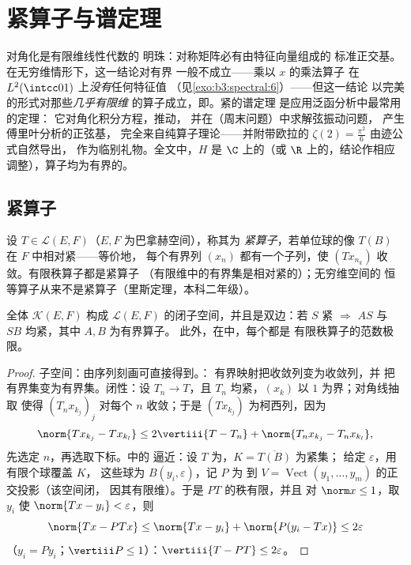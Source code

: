\chapter{紧算子与谱定理}
\label{ch:b3:spectral}

对角化是有限维线性代数的
明珠：对称矩阵必有由特征向量组成的
标准正交基。在无穷维情形下，这一结论对有界
一般不成立——乘以 $x$ 的乘法算子
在 $L^2(\intcc01)$ 上\emph{没有}任何特征值
（见\cref{exo:b3:spectral:6}）——但这一结论
以完美的形式对那些\emph{几乎有限维
}的算子成立，即。紧的谱定理
是应用泛函分析中最常用的定理：
它对角化积分方程，推动，
并在（周末问题）中求解弦振动问题，
产生傅里叶分析的正弦基，
完全来自纯算子理论——并附带欧拉的
$\zeta(2) = \frac{\pi^2}6$ 由迹公式自然导出，
作为临别礼物。全文中，$H$ 是 $\C$ 上的（或
$\R$ 上的，结论作相应调整），算子均为有界的。

\section{紧算子}

\begin{definition}\label{def:b3:spectral:compact}
设 $T \in \mathcal L(E, F)$（$E, F$ 为巴拿赫空间），称其为
\emph{紧算子}，若单位球的像 $T(B)$
在 $F$ 中相对紧——等价地，
每个有界列 $(x_n)$ 都有一个子列，使
$(Tx_{n_k})$ 收敛。有限秩算子都是紧算子
（有限维中的有界集是相对紧的）；无穷维空间的
恒等算子从来不是紧算子（里斯定理，本科二年级）。
\end{definition}

\begin{proposition}\label{prop:b3:spectral:ideal}
全体 $\mathcal K(E, F)$ 构成
$\mathcal L(E, F)$ 的闭子空间，并且是双边：若 $S$ 紧
$\Rightarrow$ $AS$ 与 $SB$ 均紧，其中 $A, B$ 为有界算子。
此外，在中，每个都是
有限秩算子的范数极限。
\end{proposition}

\begin{proof}
子空间：由序列刻画可直接得到。：
有界映射把收敛列变为收敛列，并
把有界集变为有界集。闭性：设 $T_n \to T$，且 $T_n$
均紧，$(x_k)$ 以 $1$ 为界；对角线抽取
使得 $(T_nx_{k_j})_j$ 对每个 $n$ 收敛；于是
$(Tx_{k_j})$ 为柯西列，因为
\[
\norm{Tx_{k_j} - Tx_{k_l}} \leq 2\vertiii{T - T_n} +
\norm{T_nx_{k_j} - T_nx_{k_l}} ,
\]
先选定 $n$，再选取下标。中的
逼近：设 $T$ 为，$K = \overline{T(B)}$ 为紧集；
给定 $\varepsilon$，用有限个球覆盖 $K$，
这些球为 $B(y_i, \varepsilon)$，记 $P$ 为
到 $V = \operatorname{Vect}(y_1, \dots, y_m)$ 的正交投影（该空间闭，
因其有限维）。于是 $PT$ 的秩有限，并且
对 $\norm x \leq 1$，取 $y_i$ 使 $\norm{Tx - y_i} <
\varepsilon$，则
\[
\norm{Tx - PTx} \leq \norm{Tx - y_i} + \norm{P(y_i - Tx)}
\leq 2\varepsilon
\]
（$y_i = Py_i$；$\vertiii P \leq 1$）：$\vertiii{T - PT} \leq
2\varepsilon$。
\end{proof}


